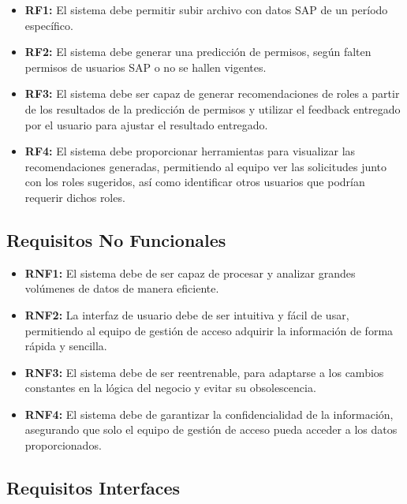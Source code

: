 \documentclass[11pt,letterpaper]{article}
\begin{document}
\begin{itemize}
    \item \textbf{RF1:} El sistema debe permitir subir archivo con datos SAP de un período específico.
    \item \textbf{RF2:} El sistema debe generar una predicción de permisos, según falten permisos de usuarios SAP o no se hallen vigentes.
    \item \textbf{RF3:} El sistema debe ser capaz de generar recomendaciones de roles a partir de los resultados de la predicción de permisos y utilizar el feedback entregado por el usuario para ajustar el resultado entregado.
    \item \textbf{RF4:} El sistema debe proporcionar herramientas para visualizar las recomendaciones generadas, permitiendo al equipo ver las solicitudes junto con los roles sugeridos, así como identificar otros usuarios que podrían requerir dichos roles.
\end{itemize}

\subsection{Requisitos No Funcionales}


\begin{itemize}
    \item \textbf{RNF1: }El sistema debe de ser capaz de procesar y analizar grandes volúmenes de datos de manera eficiente.
    \item \textbf{RNF2: }La interfaz de usuario debe de ser intuitiva y fácil de usar, permitiendo al equipo de gestión de acceso adquirir la información de forma rápida y sencilla.
    \item \textbf{RNF3: }El sistema debe de ser reentrenable, para adaptarse a los cambios constantes en la lógica del negocio y evitar su obsolescencia.
    \item \textbf{RNF4: } El sistema debe de garantizar la confidencialidad de la información, asegurando que solo el equipo de gestión de acceso pueda acceder a los datos proporcionados.
    
\end{itemize}

\subsection{Requisitos Interfaces}
\end{document}
